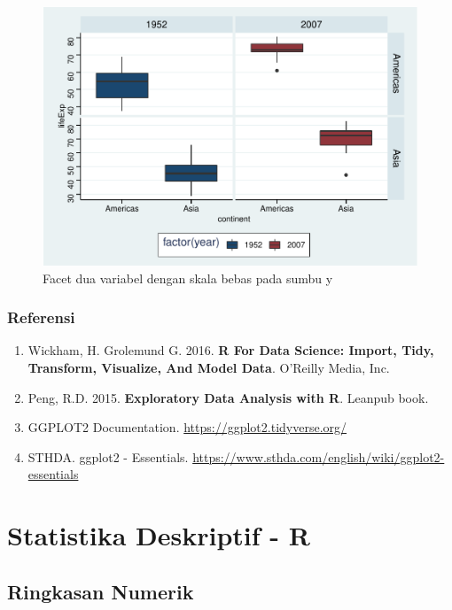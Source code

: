 \documentclass[]{book}
\providecommand{\tightlist}{%
  \setlength{\itemsep}{0pt}\setlength{\parskip}{0pt}}
\begin{document}
\begin{figure}

{\centering \includegraphics[width=0.8\linewidth]{EnvStat_files/figure-latex/ggfacetgrid4-1} 

}

\caption{Facet dua variabel dengan skala bebas pada sumbu y}\label{fig:ggfacetgrid4}
\end{figure}

\section{Referensi}\label{referensi-4}

\begin{enumerate}
\def\labelenumi{\arabic{enumi}.}
\tightlist
\item
  Wickham, H. Grolemund G. 2016. \textbf{R For Data Science: Import,
  Tidy, Transform, Visualize, And Model Data}. O'Reilly Media, Inc.
\item
  Peng, R.D. 2015. \textbf{Exploratory Data Analysis with R}. Leanpub
  book.
\item
  GGPLOT2 Documentation. \url{https://ggplot2.tidyverse.org/}
\item
  STHDA. ggplot2 - Essentials.
  \url{https://www.sthda.com/english/wiki/ggplot2-essentials}
\end{enumerate}

\part*{Statistika Deskriptif -
R}\label{part-statistika-deskriptif---r}

\chapter{Ringkasan Numerik}\label{ringkasan-numerik}
\end{document}
